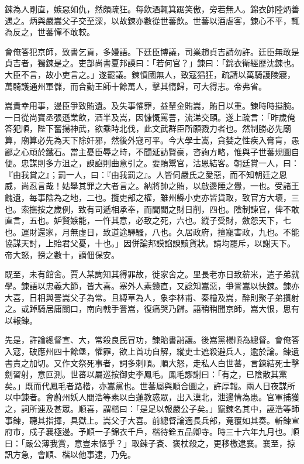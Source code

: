 \begin{pinyinscope}
{{鍊為人剛直，嫉惡如仇，然頗疏狂。每飲酒輒箕踞笑傲，旁若無人。錦衣帥陸炳善遇之。炳與嚴嵩父子交至深，以故鍊亦數從世蕃飲。世蕃以酒虐客，鍊心不平，輒為反之，世蕃憚不敢較。

會俺答犯京師，致書乞貢，多嫚語。下廷臣博議，司業趙貞吉請勿許。廷臣無敢是貞吉者，獨鍊是之。吏部尚書夏邦謨曰：「若何官？」鍊曰：「錦衣衛經歷沈鍊也。大臣不言，故小吏言之。」遂罷議。鍊憤國無人，致寇猖狂，疏請以萬騎護陵寢，萬騎護通州軍儲，而合勤王師十餘萬人，擊其惰歸，可大得志。帝弗省。

嵩貴幸用事，邊臣爭致賄遺。及失事懼罪，益輦金賄嵩，賄日以重。鍊時時搤腕。一日從尚寶丞張遜業飲，酒半及嵩，因慷慨罵詈，流涕交頤。遂上疏言：「昨歲俺答犯順，陛下奮揚神武，欲乘時北伐，此文武群臣所願戮力者也。然制勝必先廟算，廟算必先為天下除奸邪，然後外寇可平。今大學士嵩，貪婪之性疾入膏肓，愚鄙之心頑於鐵石。當主憂臣辱之時，不聞延訪賢豪，咨詢方略，惟與子世蕃規圖自便。忠謀則多方沮之，諛諂則曲意引之。要賄鬻官，沽恩結客。朝廷賞一人，曰：『由我賞之』；罰一人，曰：『由我罰之』。人皆伺嚴氏之愛惡，而不知朝廷之恩威，尚忍言哉！姑舉其罪之大者言之。納將帥之賄，以啟邊陲之釁，一也。受諸王餽遺，每事陰為之地，二也。攬吏部之權，雖州縣小吏亦皆貨取，致官方大壞，三也。索撫按之歲例，致有司遞相承奉，而閭閻之財日削，四也。陰制諫官，俾不敢直言，五也。妒賢嫉能，一忤其意，必致之死，六也。縱子受財，斂怨天下，七也。運財還家，月無虛日，致道途驛騷，八也。久居政府，擅寵害政，九也。不能協謀天討，上貽君父憂，十也。」因併論邦謨諂諛黷貨狀。請均罷斥，以謝天下。帝大怒，搒之數十，謫佃保安。

既至，未有館舍。賈人某詢知其得罪故，徙家舍之。里長老亦日致薪米，遣子弟就學。鍊語以忠義大節，皆大喜。塞外人素戇直，又諗知嵩惡，爭詈嵩以快鍊。鍊亦大喜，日相與詈嵩父子為常。且縛草為人，象李林甫、秦檜及嵩，醉則聚子弟攢射之。或踔騎居庸關口，南向戟手詈嵩，復痛哭乃歸。語稍稍聞京師，嵩大恨，思有以報鍊。

先是，許論總督宣、大，常殺良民冒功，鍊貽書誚讓。後嵩黨楊順為總督。會俺答入寇，破應州四十餘堡，懼罪，欲上首功自解，縱吏士遮殺避兵人，逾於論。鍊遺書責之加切。又作文祭死事者，詞多刺順。順大怒，走私人白世蕃，言鍊結死士擊劍習射，意叵測。世蕃以屬巡按御史李鳳毛。鳳毛謬謝曰：「有之，已陰散其黨矣。」既而代鳳毛者路楷，亦嵩黨也。世蕃屬與順合圖之，許厚報。兩人日夜謀所以中鍊者。會蔚州妖人閻浩等素以白蓮教惑眾，出入漠北，泄邊情為患。官軍捕獲之，詞所連及甚眾。順喜，謂楷曰：「是足以報嚴公子矣。」竄鍊名其中，誣浩等師事鍊，聽其指揮，具獄上。嵩父子大喜。前總督論適長兵部，竟覆如其奏。斬鍊宣府市，戍子襄極邊。予順一子錦衣千戶，楷待銓五品卿寺。時三十六年九月也。順曰：「嚴公薄我賞，意豈未愜乎？」取鍊子袞、褒杖殺之，更移檄逮襄。襄至，掠訊方急，會順、楷以他事逮，乃免。

}}
\end{pinyinscope}

